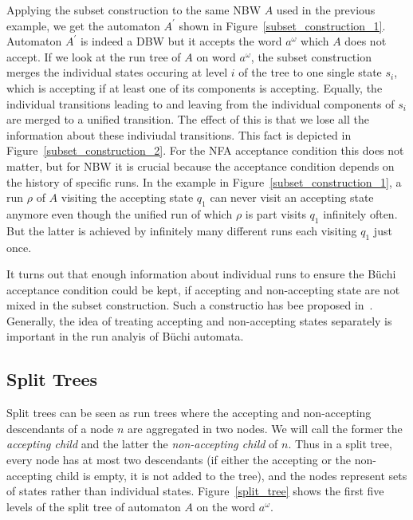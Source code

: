 \documentclass[a4paper]{report}
\begin{document}
Applying the subset construction to the same NBW $A$ used in the previous example, we get the automaton $A^\prime$ shown in Figure~\ref{subset_construction_1}. Automaton $A^\prime$ is indeed a DBW but it accepts the word $a^\omega$ which $A$ does not accept. If we look at the run tree of $A$ on word $a^\omega$, the subset construction merges the individual states occuring at level $i$ of the tree to one single state $s_i$, which is accepting if at least one of its components is accepting. Equally, the individual transitions leading to and leaving from the individual components of $s_i$ are merged to a unified transition. The effect of this is that we lose all the information about these indiviudal transitions. This fact is depicted in Figure~\ref{subset_construction_2}. For the NFA acceptance condition this does not matter, but for NBW it is crucial because the acceptance condition depends on the history of specific runs. In the example in Figure~\ref{subset_construction_1}, a run $\rho$ of $A$ visiting the accepting state $q_1$ can never visit an accepting state anymore even though the unified run of which $\rho$ is part visits $q_1$ infinitely often. But the latter is achieved by infinitely many different runs each visiting $q_1$ just once.

It turns out that enough information about individual runs to ensure the Büchi acceptance condition could be kept, if accepting and non-accepting state are not mixed in the subset construction. Such a constructio has bee proposed in~\cite{UltesNitsche2007107}. Generally, the idea of treating accepting and non-accepting states separately is important in the run analyis of Büchi automata.





\subsection{Split Trees}
Split trees can be seen as run trees where the accepting and non-accepting descendants of a node $n$ are aggregated in two nodes. We will call the former the \emph{accepting child} and the latter the \emph{non-accepting child} of $n$. Thus in a split tree, every node has at most two descendants (if either the accepting or the non-accepting child is empty, it is not added to the tree), and the nodes represent sets of states rather than individual states. Figure~\ref{split_tree} shows the first five levels of the split tree of automaton $A$ on the word $a^\omega$.
\end{document}
